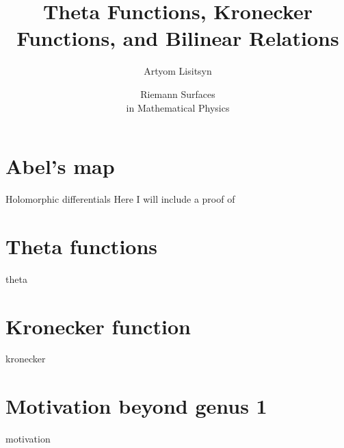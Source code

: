 \documentclass[11pt,aspectratio=169]{beamer}
\title{Theta Functions, Kronecker Functions, and Bilinear Relations}
\date[2023]{Riemann Surfaces \\ in Mathematical Physics}
\author{Artyom Lisitsyn}
\institute{D-PHYS}
\begin{document}
\def\titlefigure{elements/title-page-image}
\titleframe

\tocframe

\section{Abel's map}

\begin{frame}{Holomorphic differentials}
    Here I will include a proof of 
\end{frame}

\section{Theta functions}

\begin{frame}
    theta
\end{frame}

\section{Kronecker function}

\begin{frame}
    kronecker
\end{frame}

\section{Motivation beyond genus 1}

\begin{frame}
    motivation
\end{frame}
\end{document}
